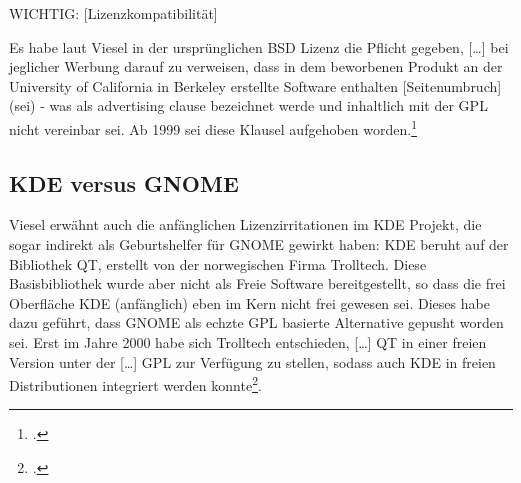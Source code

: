\documentclass[DIV=calc,BCOR=5mm,11pt,headings=small,oneside,abstract=true, toc=bib]{scrartcl}
\begin{document}
WICHTIG: [Lizenzkompatibilität]

Es habe laut Viesel in der \glqq{}ursprünglichen BSD Lizenz\grqq{} die Pflicht
gegeben, \glqq{}[\ldots] bei jeglicher Werbung darauf zu verweisen, dass
in dem beworbenen Produkt an der University of California in Berkeley
erstellte Software enthalten [Seitenumbruch] (sei)\grqq{} - was als
\glqq{}advertising clause\grqq{} bezeichnet werde und inhaltlich mit der GPL
nicht vereinbar sei. Ab 1999 sei diese Klausel aufgehoben
worden.\footcite[vgl.][67f]{Viesel2006a}

\subsection{KDE versus GNOME}

Viesel erwähnt auch die anfänglichen Lizenzirritationen im KDE Projekt, die
sogar indirekt als Geburtshelfer für GNOME gewirkt haben: KDE beruht auf der
Bibliothek QT, erstellt von der \glqq{}norwegischen Firma Trolltech\grqq{}.
Diese Basisbibliothek wurde aber nicht als Freie Software bereitgestellt, so
dass die frei Oberfläche KDE (anfänglich) eben im Kern nicht frei gewesen sei.
Dieses habe dazu geführt, dass GNOME als echzte GPL basierte Alternative gepusht
worden sei. Erst im Jahre 2000 habe sich Trolltech entschieden, \glqq{}[\ldots]
QT in einer freien Version unter der [\ldots] GPL zur Verfügung zu
stellen\grqq{}, sodass auch KDE in freien Distributionen integriert werden
konnte\footcite[vgl.][165 s.a. 167f]{Viesel2006a}.

\small

\end{document}
